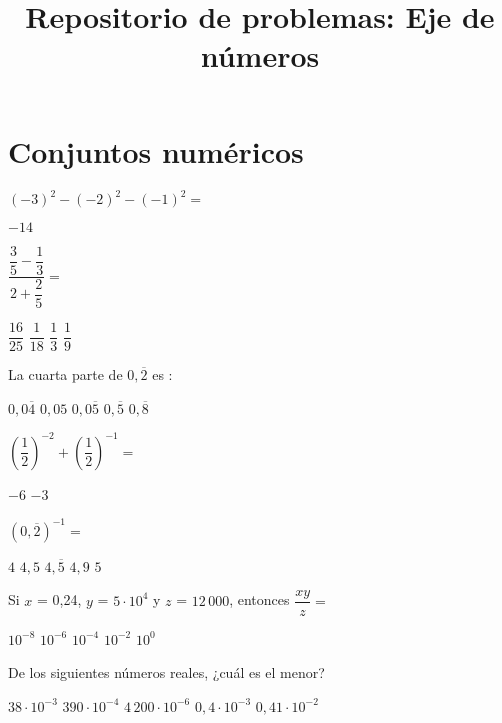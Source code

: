 \documentclass[pagina vacia]{srs}
\title{Repositorio de problemas: Eje de números}
\begin{document}
\maketitle
\section{Conjuntos numéricos}

\begin{preguntas}[after-item-skip=1cm]
\pregunta \( \left(-3\right)^2 - \left(-2\right)^2 - \left(-1\right)^2 = \)
\begin{vertical}
\alternativa $-14$
\end{vertical}

\pregunta \( \dfrac{\dfrac{3}{5} - \dfrac{1}{3}}{2 + \dfrac{2}{5}} = \)
\begin{vertical}
\alternativa \( \dfrac{16}{25} \)
\alternativa \( \dfrac{1}{18} \)
\alternativa \( \dfrac{1}{3} \)
\alternativa \( \dfrac{1}{9} \)
\end{vertical}

\pregunta La cuarta parte de $0,\overline{2}$ es :
\begin{vertical}
\alternativa $0,0\overline{4}$
\alternativa $0,05$
\alternativa $0,0\overline{5}$
\alternativa $0,\overline{5}$
\alternativa $0,\overline{8}$
\end{vertical}

\pregunta \( \left(\dfrac{1}{2}\right)^{-2} + \left(\dfrac{1}{2}\right)^{-1} = \)
\begin{vertical}
\alternativa $-6$
\alternativa $-3$
\end{vertical}

\pregunta \( (0,\overline{2})^{-1} = \)
\begin{vertical}
\alternativa $4$
\alternativa $4,5$
\alternativa $4,\overline{5}$
\alternativa $4,9$
\alternativa $5$
\end{vertical}

\pregunta Si \(x\) = 0,24, \(y\) = \(5 \cdot 10^4\) y \(z\) = \(12\,000\), entonces
\( \dfrac{xy}{z} = \)
\begin{vertical}
\alternativa \( 10^{-8} \)
\alternativa \( 10^{-6} \)
\alternativa \( 10^{-4} \)
\alternativa \( 10^{-2} \)
\alternativa \( 10^{0} \)
\end{vertical}

\pregunta De los siguientes números reales, ¿cuál es el menor?
\begin{vertical}
\alternativa \( 38 \cdot 10^{-3} \)
\alternativa \( 390 \cdot 10^{-4} \)
\alternativa \( 4\,200 \cdot 10^{-6} \)
\alternativa \( 0,4 \cdot 10^{-3} \)
\alternativa \( 0,41 \cdot 10^{-2} \)
\end{vertical}


\end{preguntas}
\end{document}
